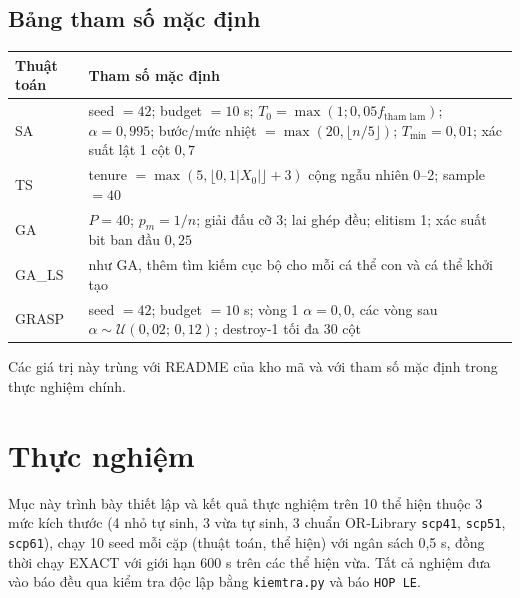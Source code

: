 \documentclass[a4paper,12pt]{article}
\begin{document}
\subsection{Bảng tham số mặc định}
\begin{center}
\begin{tabularx}{\textwidth}{lY}
\toprule
Thuật toán & Tham số mặc định\\
\midrule
SA & seed $=42$; budget $=10$ s; $T_0=\max(1;0{,}05f_{\text{tham lam}})$; $\alpha=0{,}995$; bước/mức nhiệt $=\max(20,\lfloor n/5\rfloor)$; $T_{\min}=0{,}01$; xác suất lật 1 cột $0{,}7$\\
TS & tenure $=\max(5,\lfloor0{,}1|X_0|\rfloor+3)$ cộng ngẫu nhiên 0--2; sample $=40$\\
GA & $P=40$; $p_m=1/n$; giải đấu cỡ 3; lai ghép đều; elitism 1; xác suất bit ban đầu $0{,}25$\\
GA\_LS & như GA, thêm tìm kiếm cục bộ cho mỗi cá thể con và cá thể khởi tạo\\
GRASP & seed $=42$; budget $=10$ s; vòng 1 $\alpha=0{,}0$, các vòng sau $\alpha \sim \mathcal{U}(0{,}02;\,0{,}12)$; destroy-1 tối đa 30 cột\\
\bottomrule
\end{tabularx}
\end{center}
Các giá trị này trùng với README của kho mã và với tham số mặc định trong thực nghiệm chính.

\section{Thực nghiệm}
\noindent Mục này trình bày thiết lập và kết quả thực nghiệm trên 10 thể hiện thuộc 3 mức kích thước (4 nhỏ tự sinh, 3 vừa tự sinh, 3 chuẩn OR-Library \texttt{scp41}, \texttt{scp51}, \texttt{scp61}), chạy 10 seed mỗi cặp (thuật toán, thể hiện) với ngân sách 0,5 s, đồng thời chạy EXACT với giới hạn 600 s trên các thể hiện vừa. Tất cả nghiệm đưa vào báo đều qua kiểm tra độc lập bằng \texttt{kiemtra.py} và báo \texttt{HOP LE}.
\end{document}
